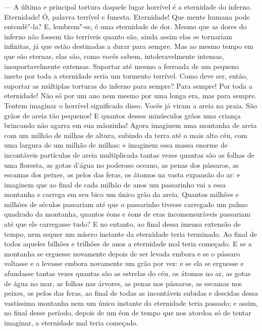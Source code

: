  --- A última e principal tortura daquele lugar horrível é a eternidade do
inferno. Eternidade! Ó, palavra terrível e funesta. Eternidade! Que
mente humana pode entendê"-la? E, lembrem"-se, é uma eternidade de dor.
Mesmo que as dores do inferno não fossem tão terríveis quanto são,
ainda assim elas se tornariam infinitas, já que estão destinadas a
durar para sempre. Mas ao mesmo tempo em que são eternas, elas são,
como vocês sabem, intoleravelmente intensas, insuportavelmente
extensas. Suportar até mesmo a ferroada de um pequeno inseto por toda a
eternidade seria um tormento terrível. Como deve ser, então, suportar
as múltiplas torturas do inferno para sempre? Para sempre! Por toda a
eternidade! Não só por um ano nem mesmo por uma longa era, mas para
sempre. Tentem imaginar o horrível significado disso. Vocês já viram a
areia na praia. São grãos de areia tão pequenos! E quantos desses
minúsculos grãos uma criança brincando não agarra em sua mãozinha!
Agora imaginem uma montanha de areia com um milhão de milhas de altura,
subindo da terra até o mais alto céu, com uma largura de um milhão de
milhas: e imaginem essa massa enorme de incontáveis partículas de areia
multiplicada tantas vezes quantas são as folhas de uma floresta, as
gotas d’água no poderoso oceano, as penas dos
pássaros, as escamas dos peixes, os pelos das feras, os átomos na vasta
expansão do ar: e imaginem que ao final de cada milhão de anos um
passarinho vai a essa montanha e carrega em seu bico um único grão da
areia. Quantos milhões e milhões de séculos passariam até que o
passarinho tivesse carregado um palmo quadrado da montanha, quantos
éons e éons de eras incomensuráveis passariam até que ele carregasse
tudo? E no entanto, ao final dessa imensa extensão de tempo, nem sequer
um mísero instante da eternidade teria terminado. Ao final de todos
aqueles bilhões e trilhões de anos a eternidade mal teria começado. E
se a montanha se erguesse novamente depois de ser levada embora e se o
pássaro voltasse e a levasse embora novamente um grão por vez: e se ela
se erguesse e afundasse tantas vezes quantas são as estrelas do céu, os
átomos no ar, as gotas de água no mar, as folhas nas árvores, as penas
nos pássaros, as escamas nos peixes, os pelos das feras, ao final de
todas as incontáveis subidas e descidas dessa vastíssima montanha nem
um único instante da eternidade teria passado; e assim, no final desse
período, depois de um éon de tempo que nos atordoa só de tentar
imaginar, a eternidade mal teria começado.

